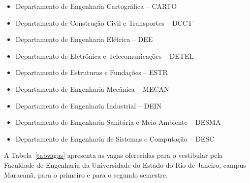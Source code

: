 \begin{itemize}
\item Departamento de Engenharia Cartográfica – CARTO
\item Departamento de Construção Civil e Transportes – DCCT
\item Departamento de Engenharia Elétrica – DEE
\item Departamento de Eletrônica e Telecomunicações – DETEL
\item Departamento de Estruturas e Fundações – ESTR
\item Departamento de Engenharia Mecânica – MECAN
\item Departamento de Engenharia Industrial – DEIN
\item Departamento de Engenharia Sanitária e Meio Ambiente – DESMA
\item Departamento de Engenharia de Sistemas e Computação – DESC
\end{itemize}

A Tabela~\ref{tabvagas} apresenta as vagas oferecidas para o vestibular pela Faculdade de Engenharia da Universidade do Estado do Rio de Janeiro, campus Maracanã, para o primeiro e para o segundo semestre.

